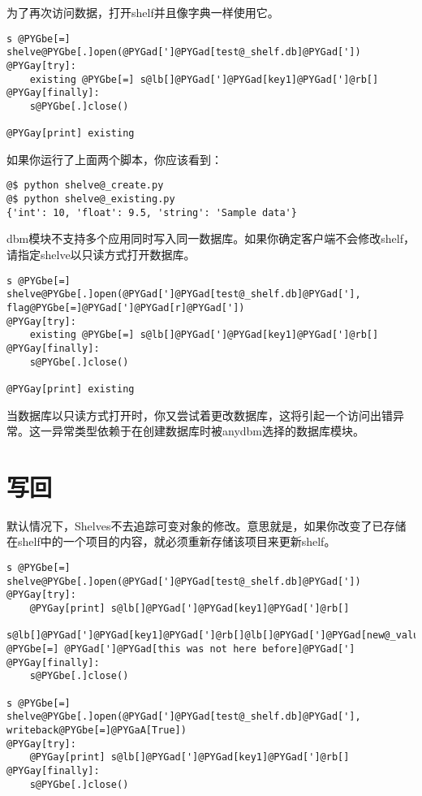 \documentclass[a4paper,10pt,english]{manual}
\begin{document}
为了再次访问数据，打开shelf并且像字典一样使用它。

\begin{Verbatim}[commandchars=@\[\]]
s @PYGbe[=] shelve@PYGbe[.]open(@PYGad[']@PYGad[test@_shelf.db]@PYGad['])
@PYGay[try]:
    existing @PYGbe[=] s@lb[]@PYGad[']@PYGad[key1]@PYGad[']@rb[]
@PYGay[finally]:
    s@PYGbe[.]close()

@PYGay[print] existing
\end{Verbatim}

如果你运行了上面两个脚本，你应该看到：

\begin{Verbatim}[commandchars=@\[\]]
@$ python shelve@_create.py
@$ python shelve@_existing.py
{'int': 10, 'float': 9.5, 'string': 'Sample data'}
\end{Verbatim}

dbm模块不支持多个应用同时写入同一数据库。如果你确定客户端不会修改shelf， 请指定shelve以只读方式打开数据库。

\begin{Verbatim}[commandchars=@\[\]]
s @PYGbe[=] shelve@PYGbe[.]open(@PYGad[']@PYGad[test@_shelf.db]@PYGad['], flag@PYGbe[=]@PYGad[']@PYGad[r]@PYGad['])
@PYGay[try]:
    existing @PYGbe[=] s@lb[]@PYGad[']@PYGad[key1]@PYGad[']@rb[]
@PYGay[finally]:
    s@PYGbe[.]close()

@PYGay[print] existing
\end{Verbatim}

当数据库以只读方式打开时，你又尝试着更改数据库，这将引起一个访问出错异常。这一异常类型依赖于在创建数据库时被anydbm选择的数据库模块。


\section{写回}

默认情况下，Shelves不去追踪可变对象的修改。意思就是，如果你改变了已存储在shelf中的一个项目的内容，就必须重新存储该项目来更新shelf。

\begin{Verbatim}[commandchars=@\[\]]
s @PYGbe[=] shelve@PYGbe[.]open(@PYGad[']@PYGad[test@_shelf.db]@PYGad['])
@PYGay[try]:
    @PYGay[print] s@lb[]@PYGad[']@PYGad[key1]@PYGad[']@rb[]
    s@lb[]@PYGad[']@PYGad[key1]@PYGad[']@rb[]@lb[]@PYGad[']@PYGad[new@_value]@PYGad[']@rb[] @PYGbe[=] @PYGad[']@PYGad[this was not here before]@PYGad[']
@PYGay[finally]:
    s@PYGbe[.]close()

s @PYGbe[=] shelve@PYGbe[.]open(@PYGad[']@PYGad[test@_shelf.db]@PYGad['], writeback@PYGbe[=]@PYGaA[True])
@PYGay[try]:
    @PYGay[print] s@lb[]@PYGad[']@PYGad[key1]@PYGad[']@rb[]
@PYGay[finally]:
    s@PYGbe[.]close()
\end{Verbatim}
\end{document}

